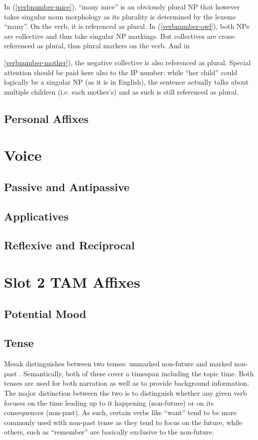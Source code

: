 \documentclass[paper=6in:9in, fontsize=10.5]{scrbook}
\newcommand{\en}[1]{``#1''}
\newcommand{\mes}[1]{\hspace{0pt}{\color{teal}#1}}
\newcommand{\ý}{ɨ́}
\begin{document}
In (\ref{verbnumber-mice}), \en{many mice} is an obviously plural NP that however takes singular noun morphology as its plurality is determined by the lexeme \en{many}. On the verb, it is referenced as plural. In (\ref{verbnumber-owl}), both NPs are collective and thus take singular NP markings. But collectives are cross-referenced as plural, thus plural markers on the verb. And in {\ref{verbnumber-mother}), the negative collective is also referenced as plural. Special attention should be paid here also to the IP number: while \en{her child} could logically be a singular NP (as it is in English), the sentence actually talks about multiple children (i.e. each mother’s) and as such is still referenced as plural.


\subsection{Personal Affixes} \label{ssec:verbperson}

\section{Voice}
\subsection{Passive and Antipassive}
\subsection{Applicatives}
\subsection{Reflexive and Reciprocal} \label{ssec:reflexive}

\section{Slot 2 TAM Affixes}
\subsection{Potential Mood}
\subsection{Tense}
Mesak distinguishes between two tenses: unmarked non-future and marked non-past \mes{-pv-}. Semantically, both of these cover a timespan including the topic time. Both tenses are used for both narration as well as to provide background information. The major distinction between the two is to distinguish whether any given verb focuses on the time leading up to it happening (non-future) or on its consequences (non-past). As such, certain verbs like \en{want} tend to be more commonly used with non-past tense as they tend to focus on the future, while others, such as \en{remember} are basically exclusive to the non-future. 

}
\end{document}
